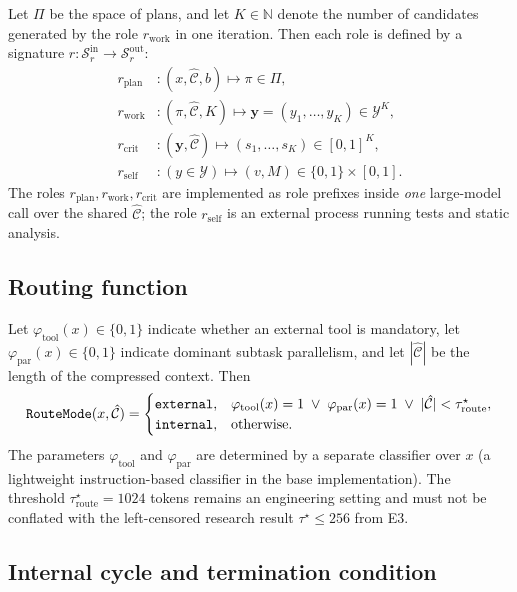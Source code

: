 Let $\Pi$ be the space of plans, and let $K\in\mathbb{N}$ denote the number of candidates generated by the role $r_{\text{work}}$ in one iteration. Then each role is defined by a signature $r:\mathcal{S}_r^{\text{in}}\to\mathcal{S}_r^{\text{out}}$:
\begin{align*}
r_{\text{plan}} &:(x,\hat{\mathcal{C}},b)\mapsto \pi\in\Pi, \\
r_{\text{work}} &:(\pi,\hat{\mathcal{C}},K)\mapsto \mathbf{y}=(y_1,\dots,y_K)\in\mathcal{Y}^K, \\
r_{\text{crit}} &:(\mathbf{y},\hat{\mathcal{C}})\mapsto (s_1,\dots,s_K)\in[0,1]^K, \\
r_{\text{self}} &:(y\in\mathcal{Y})\mapsto (v,M)\in\{0,1\}\times[0,1].
\end{align*}
The roles $r_{\text{plan}},r_{\text{work}},r_{\text{crit}}$ are implemented as role prefixes inside \emph{one} large-model call over the shared $\hat{\mathcal{C}}$; the role $r_{\text{self}}$ is an external process running tests and static analysis.

\subsection{Routing function}

\begin{definition}[RouteMode]\label{def:routemode}
Let $\varphi_{\mathrm{tool}}(x)\in\{0,1\}$ indicate whether an external tool is mandatory, let $\varphi_{\mathrm{par}}(x)\in\{0,1\}$ indicate dominant subtask parallelism, and let $|\hat{\mathcal{C}}|$ be the length of the compressed context. Then
\[
\textnormal{\texttt{RouteMode}}(x,\hat{\mathcal{C}})=\begin{cases}\textnormal{\texttt{external}}, & \varphi_{\mathrm{tool}}(x)=1 \;\lor\; \varphi_{\mathrm{par}}(x)=1 \;\lor\; |\hat{\mathcal{C}}|<\tau^\star_{\mathrm{route}},\\ \textnormal{\texttt{internal}}, & \text{otherwise}.\end{cases}
\]
The parameters $\varphi_{\mathrm{tool}}$ and $\varphi_{\mathrm{par}}$ are determined by a separate classifier over $x$ (a lightweight instruction-based classifier in the base implementation). The threshold $\tau^\star_{\mathrm{route}}=1024$ tokens remains an engineering setting and must not be conflated with the left-censored research result $\tau^\star\le256$ from E3.
\end{definition}

\subsection{Internal cycle and termination condition}

